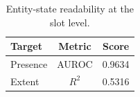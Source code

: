 \begin{table}[t]
\centering
\caption{Entity-state readability at the slot level.}
\label{tab:entity-information}
\small
\begin{tabular}{@{}lcc@{}}
\toprule
\textbf{Target} & \textbf{Metric} & \textbf{Score} \\
\midrule
Presence & AUROC & 0.9634 \\
Extent & $R^2$ & 0.5316 \\
\bottomrule
\end{tabular}
\end{table}
